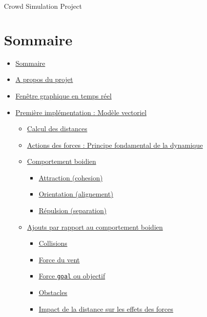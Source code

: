\documentclass[
]{article}
\author{}
\date{}
\providecommand{\tightlist}{%
  \setlength{\itemsep}{0pt}\setlength{\parskip}{0pt}}
\begin{document}
Crowd Simulation Project

\hypertarget{sommaire}{%
\section{Sommaire}\label{sommaire}}

\begin{itemize}
\tightlist
\item
  \protect\hyperlink{sommaire}{Sommaire}
\item
  \protect\hyperlink{a-propos-du-projet}{A propos du projet}
\item
  \protect\hyperlink{fenuxeatre-graphique-en-temps-ruxe9el}{Fenêtre
  graphique en temps réel}
\item
  \protect\hyperlink{premiuxe8re-impluxe9mentation--moduxe8le-vectoriel}{Première
  implémentation : Modèle vectoriel}

  \begin{itemize}
  \tightlist
  \item
    \protect\hyperlink{calcul-des-distances}{Calcul des distances}
  \item
    \protect\hyperlink{actions-des-forces--principe-fondamental-de-la-dynamique}{Actions
    des forces : Principe fondamental de la dynamique}
  \item
    \protect\hyperlink{comportement-boidien}{Comportement boidien}

    \begin{itemize}
    \tightlist
    \item
      \protect\hyperlink{attraction-cohesion}{Attraction (cohesion)}
    \item
      \protect\hyperlink{orientation-alignement}{Orientation
      (alignement)}
    \item
      \protect\hyperlink{ruxe9pulsion-separation}{Répulsion
      (separation)}
    \end{itemize}
  \item
    \protect\hyperlink{ajouts-par-rapport-au-comportement-boidien}{Ajouts
    par rapport au comportement boidien}

    \begin{itemize}
    \tightlist
    \item
      \protect\hyperlink{collisions}{Collisions}
    \item
      \protect\hyperlink{force-du-vent}{Force du vent}
    \item
      \protect\hyperlink{force-goal-ou-objectif}{Force \texttt{goal} ou
      objectif}
    \item
      \protect\hyperlink{obstacles}{Obstacles}
    \item
      \protect\hyperlink{impact-de-la-distance-sur-les-effets-des-forces}{Impact
      de la distance sur les effets des forces}


\end{itemize}
\end{itemize}
\end{itemize}
\end{document}

